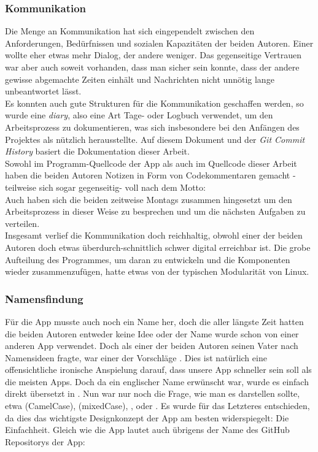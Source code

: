 \documentclass[a4paper,11pt]{article}
\begin{document}
\subsubsection{Kommunikation}

Die Menge an Kommunikation hat sich eingependelt zwischen den Anforderungen, Bedürfnissen und sozialen Kapazitäten der beiden Autoren. Einer wollte eher etwas mehr Dialog, der andere weniger. Das gegenseitige Vertrauen war aber auch soweit vorhanden, dass man sicher sein konnte, dass der andere gewisse abgemachte Zeiten einhält und Nachrichten nicht unnötig lange unbeantwortet lässt.\\

Es konnten auch gute Strukturen für die Kommunikation geschaffen werden, so wurde eine \textit{diary}, also eine Art Tage- oder Logbuch verwendet, um den Arbeitsprozess zu dokumentieren, was sich insbesondere bei den Anfängen des Projektes als nützlich herausstellte. Auf diesem Dokument und der \textit{Git Commit History} basiert die Dokumentation dieser Arbeit.\\

Sowohl im Programm-Quellcode der App als auch im Quellcode dieser Arbeit haben die beiden Autoren Notizen in Form von Codekommentaren gemacht - teilweise sich sogar gegenseitig- voll nach dem Motto: \\

Auch haben sich die beiden zeitweise Montags zusammen hingesetzt um den Arbeitsprozess in dieser Weise zu besprechen und um die nächsten Aufgaben zu verteilen.\\

Insgesamt verlief die Kommunikation doch reichhaltig, obwohl einer der beiden Autoren doch etwas überdurch-schnittlich schwer digital erreichbar ist. Die grobe Aufteilung des Programmes, um daran zu entwickeln und die Komponenten wieder zusammenzufügen, hatte etwas von der typischen Modularität von Linux.

\subsubsection{Namensfindung}
Für die App musste auch noch ein Name her, doch die aller längste Zeit hatten die beiden Autoren entweder keine Idee oder der Name wurde schon von einer anderen App verwendet. Doch als einer der beiden Autoren seinen Vater nach Namensideen fragte, war einer der Vorschläge . Dies ist natürlich eine offensichtliche ironische Anspielung darauf, dass unsere App schneller sein soll als die meisten Apps. Doch da ein englischer Name erwünscht war, wurde es einfach direkt übersetzt in . Nun war nur noch die Frage, wie man es darstellen sollte, etwa  (CamelCase),  (mixedCase), ,  oder . Es wurde für das Letzteres entschieden, da dies das wichtigste Designkonzept der App am besten widerspiegelt: Die Einfachheit. Gleich wie die App lautet auch übrigens der Name des GitHub Repositorys der App:\\
\end{document}
